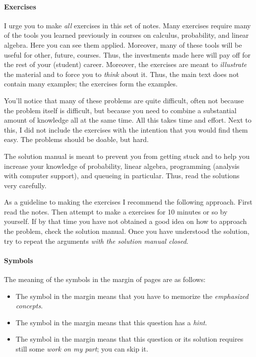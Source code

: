 \paragraph{Exercises}

I urge you to make \emph{all} exercises in this set of notes. Many
exercises require many of the tools you learned previously in courses
on calculus, probability, and linear algebra. Here you can see them
applied. Moreover, many of these tools will be useful for other,
future, courses. Thus, the investments made here will pay off for the
rest of your (student) career. Moreover, the exercises are meant to
\emph{illustrate} the material and to force you to \textit{think}
about it. Thus, the main text does not contain many examples; the
exercises form the examples.

You'll notice that many of these problems are quite difficult, often
not because the problem itself is difficult, but because you need to
combine a substantial amount of knowledge all at the same time.  All
this takes time and effort. Next to this, I did not include the
exercises with the intention that you would find them easy. The
problems should be doable, but hard.

The solution manual is meant to prevent you from getting stuck and to
help you increase your knowledge of probability, linear algebra,
programming (analysis with computer support), and queueing in
particular. Thus, read the solutions very carefully. 

As a guideline to making the exercises I recommend the following
approach.  First read the notes. Then attempt to make a exercises for
10 minutes or so by yourself. If by that time you have not obtained a
good idea on how to approach the problem, check the solution
manual. Once you have understood the solution, try to repeat the
arguments \emph{with the solution manual closed}.

\paragraph{Symbols}

The meaning of the symbols in the margin of pages are as follows:
\begin{itemize}
\item The symbol \recall{} in the margin means that you have to
  memorize the \emph{emphasized concepts}.
\item The symbol \hintsymbol in the margin means that this question
  has a \emph{hint}.
\item The symbol \tbd in the margin means that this question or its
  solution requires still some \emph{work on my part}; you can skip
  it.
\end{itemize}



